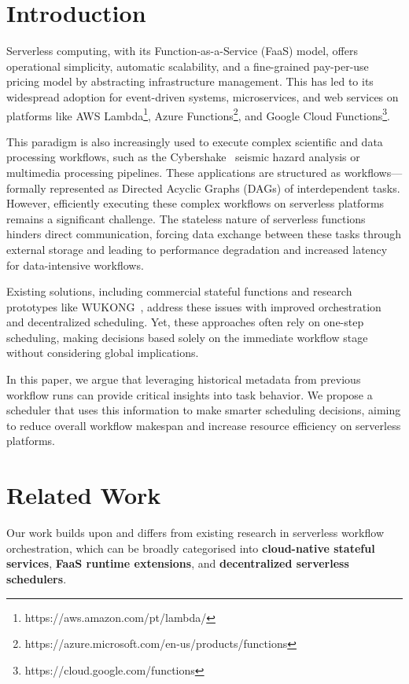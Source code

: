 \documentclass[conference]{IEEEtran}
\begin{document}
\section{Introduction}

Serverless computing, with its Function-as-a-Service (FaaS) model, offers operational simplicity, automatic scalability, and a fine-grained pay-per-use pricing model by abstracting infrastructure management. This has led to its widespread adoption for event-driven systems, microservices, and web services on platforms like AWS Lambda\footnote{https://aws.amazon.com/pt/lambda/}, Azure Functions\footnote{https://azure.microsoft.com/en-us/products/functions}, and Google Cloud Functions\footnote{https://cloud.google.com/functions}.

This paradigm is also increasingly used to execute complex scientific and data processing workflows, such as the Cybershake~\cite{cybershake_workflow} seismic hazard analysis or multimedia processing pipelines. These applications are structured as workflows—formally represented as Directed Acyclic Graphs (DAGs) of interdependent tasks. However, efficiently executing these complex workflows on serverless platforms remains a significant challenge. The stateless nature of serverless functions hinders direct communication, forcing data exchange between these tasks through external storage and leading to performance degradation and increased latency for data-intensive workflows.

Existing solutions, including commercial stateful functions and research prototypes like WUKONG~\cite{wukong_2}, address these issues with improved orchestration and decentralized scheduling. Yet, these approaches often rely on one-step scheduling, making decisions based solely on the immediate workflow stage without considering global implications.

In this paper, we argue that leveraging historical metadata from previous workflow runs can provide critical insights into task behavior. We propose a scheduler that uses this information to make smarter scheduling decisions, aiming to reduce overall workflow makespan and increase resource efficiency on serverless platforms.


\section{Related Work}
\label{s:related_work}

Our work builds upon and differs from existing research in serverless workflow orchestration, which can be broadly categorised into \textbf{cloud-native stateful services}, \textbf{FaaS runtime extensions}, and \textbf{decentralized serverless schedulers}.
\end{document}
